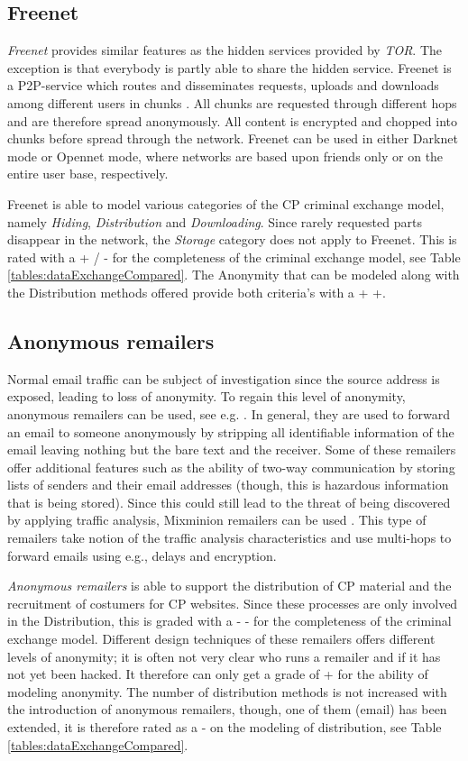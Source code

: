 \documentclass{sig-alternate-br}
\begin{document}
\subsection{Freenet}
\textit{Freenet} \cite{clarke2001freenet} provides similar features as the hidden services provided by \textit{TOR}. The exception is that everybody is partly able to share the hidden service. Freenet is a P2P-service which routes and disseminates requests, uploads and downloads among different users in chunks \cite{clarke2001freenet}. All chunks are requested through different hops and are therefore spread anonymously. All content is encrypted and chopped into chunks before spread through the network. Freenet can be used in either Darknet mode or Opennet mode, where networks are based upon friends only or on the entire user base, respectively.

Freenet is able to model various categories of the CP criminal exchange model, namely \textit{Hiding}, \textit{Distribution} and \textit{Downloading}. Since rarely requested parts disappear in the network, the \textit{Storage} category does not apply to Freenet. This is rated with a + / - for the completeness of the criminal exchange model, see Table \ref{tables:dataExchangeCompared}. The Anonymity that can be modeled along with the Distribution methods offered provide both criteria's with a + +.

\subsection{Anonymous remailers}
Normal email traffic can be subject of investigation since the source address is exposed, leading to loss of anonymity. To regain this level of anonymity, anonymous remailers can be used, see e.g. \cite{danezis2003mixminion}. In general, they are used to forward an email to someone anonymously by stripping all identifiable information of the email leaving nothing but the bare text and the receiver. Some of these remailers offer additional features such as the ability of two-way communication by storing lists of senders and their email addresses (though, this is hazardous information that is being stored). Since this could still lead to the threat of being discovered by applying traffic analysis, Mixminion remailers can be used \cite{danezis2003mixminion}. This type of remailers take notion of the traffic analysis characteristics and use multi-hops to forward emails using e.g., delays and encryption. 

\textit{Anonymous remailers} is able to support the distribution of CP material and the recruitment of costumers for CP websites. Since these processes are only involved in the Distribution, this is graded with a - - for the completeness of the criminal exchange model. Different design techniques of these remailers offers different levels of anonymity; it is often not very clear who runs a remailer and if it has not yet been hacked. It therefore can only get a grade of + for the ability of modeling anonymity. The number of distribution methods is not increased with the introduction of anonymous remailers, though, one of them (email) has been extended, it is therefore rated as a - on the modeling of distribution, see Table \ref{tables:dataExchangeCompared}.
\end{document}
